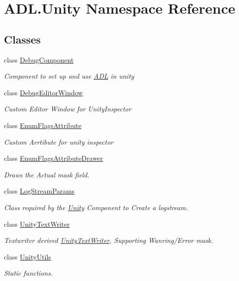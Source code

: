 \hypertarget{namespace_a_d_l_1_1_unity}{}\section{A\+D\+L.\+Unity Namespace Reference}
\label{namespace_a_d_l_1_1_unity}
\subsection*{Classes}
\begin{DoxyCompactItemize}
\item 
class \mbox{\hyperlink{class_a_d_l_1_1_unity_1_1_debug_component}{Debug\+Component}}
\begin{DoxyCompactList}\small\item\em Component to set up and use \mbox{\hyperlink{namespace_a_d_l}{A\+DL}} in unity \end{DoxyCompactList}\item 
class \mbox{\hyperlink{class_a_d_l_1_1_unity_1_1_debug_editor_window}{Debug\+Editor\+Window}}
\begin{DoxyCompactList}\small\item\em Custom Editor Window for Unity\+Inspector \end{DoxyCompactList}\item 
class \mbox{\hyperlink{class_a_d_l_1_1_unity_1_1_enum_flags_attribute}{Enum\+Flags\+Attribute}}
\begin{DoxyCompactList}\small\item\em Custom Arrtibute for unity inspector \end{DoxyCompactList}\item 
class \mbox{\hyperlink{class_a_d_l_1_1_unity_1_1_enum_flags_attribute_drawer}{Enum\+Flags\+Attribute\+Drawer}}
\begin{DoxyCompactList}\small\item\em Draws the Actual mask field. \end{DoxyCompactList}\item 
class \mbox{\hyperlink{class_a_d_l_1_1_unity_1_1_log_stream_params}{Log\+Stream\+Params}}
\begin{DoxyCompactList}\small\item\em Class required by the \mbox{\hyperlink{namespace_a_d_l_1_1_unity}{Unity}} Component to Create a logstream. \end{DoxyCompactList}\item 
class \mbox{\hyperlink{class_a_d_l_1_1_unity_1_1_unity_text_writer}{Unity\+Text\+Writer}}
\begin{DoxyCompactList}\small\item\em Textwriter derived \mbox{\hyperlink{class_a_d_l_1_1_unity_1_1_unity_text_writer}{Unity\+Text\+Writer}}, Supporting Wanring/\+Error mask. \end{DoxyCompactList}\item 
class \mbox{\hyperlink{class_a_d_l_1_1_unity_1_1_unity_utils}{Unity\+Utils}}
\begin{DoxyCompactList}\small\item\em Static functions. \end{DoxyCompactList}\end{DoxyCompactItemize}
